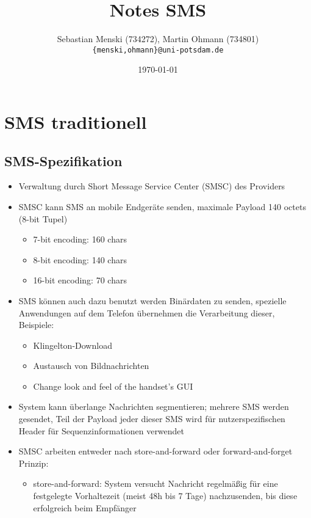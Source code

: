 \documentclass[german,12pt,a4paper]{article}
\begin{document}
\title{\textbf{Notes SMS}}
\author{Sebastian Menski (734272), Martin Ohmann (734801) \\ \texttt{\{menski,ohmann\}@uni-potsdam.de}}
\date{\today}

\maketitle

\section{SMS traditionell}
\subsection{SMS-Spezifikation}
\begin{itemize}
	\item Verwaltung durch Short Message Service Center (SMSC) des Providers
	\item SMSC kann SMS an mobile Endgeräte senden, maximale Payload 140 octets (8-bit Tupel)
		\begin{itemize}
			\item 7-bit encoding: 160 chars
			\item 8-bit encoding: 140 chars
			\item 16-bit encoding: 70 chars
		\end{itemize}
	\item SMS können auch dazu benutzt werden Binärdaten zu senden, spezielle Anwendungen auf 
		dem Telefon übernehmen die Verarbeitung dieser, Beispiele:
		\begin{itemize}
			\item Klingelton-Download
			\item Austausch von Bildnachrichten
			\item Change look and feel of the handset's GUI
		\end{itemize}		
	\item System kann überlange Nachrichten segmentieren; mehrere SMS werden gesendet, Teil der Payload jeder
		dieser SMS wird für nutzerspezifischen Header für Sequenzinformationen verwendet
	\item SMSC arbeiten entweder nach store-and-forward oder forward-and-forget Prinzip:
		\begin{itemize}
			\item store-and-forward: System versucht Nachricht regelmäßig für eine festgelegte 
				Vorhaltezeit (meist 48h bis 7 Tage) nachzusenden, bis diese erfolgreich beim Empfänger 

\end{itemize}
\end{itemize}
\end{document}
